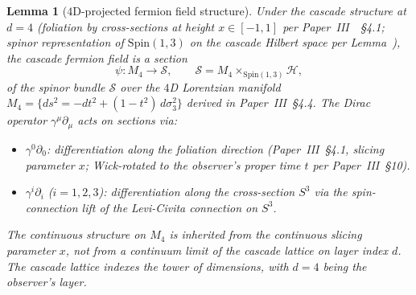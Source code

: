 \documentclass[12pt,a4paper]{article}
\newtheorem{lemma}[theorem]{Lemma}
\begin{document}
\begin{lemma}[$4$D-projected fermion field structure]\label{lem:4d-fermion-projection}
Under the cascade structure at $d=4$ (foliation by cross-sections at
height $x \in [-1,1]$ per Paper~III~\cite{part3}~\S4.1; spinor
representation of $\mathrm{Spin}(1,3)$ on the cascade Hilbert space
per Lemma~), the cascade fermion field
is a section
\[
\psi : M_4 \to \mathcal{S}, \qquad
\mathcal{S} = M_4 \times_{\mathrm{Spin}(1,3)} \mathcal{H},
\]
of the spinor bundle $\mathcal{S}$ over the $4$D Lorentzian manifold
$M_4 = \{ds^2 = -dt^2 + (1-t^2)\,d\sigma_3^2\}$ derived in
Paper~III~\S4.4. The Dirac operator $\gamma^\mu\partial_\mu$ acts
on sections via:
\begin{itemize}[nosep]
\item $\gamma^0\partial_0$: differentiation along the foliation
direction (Paper~III~\S4.1, slicing parameter $x$; Wick-rotated to
the observer's proper time $t$ per Paper~III~\S10).
\item $\gamma^i\partial_i$ ($i = 1,2,3$): differentiation along the
cross-section $S^3$ via the spin-connection lift of the Levi-Civita
connection on $S^3$.
\end{itemize}
The continuous structure on $M_4$ is inherited from the
\emph{continuous} slicing parameter $x$, not from a continuum limit
of the cascade lattice on layer index $d$. The cascade lattice
indexes the tower of dimensions, with $d=4$ being the observer's
layer.
\end{lemma}
\end{document}
